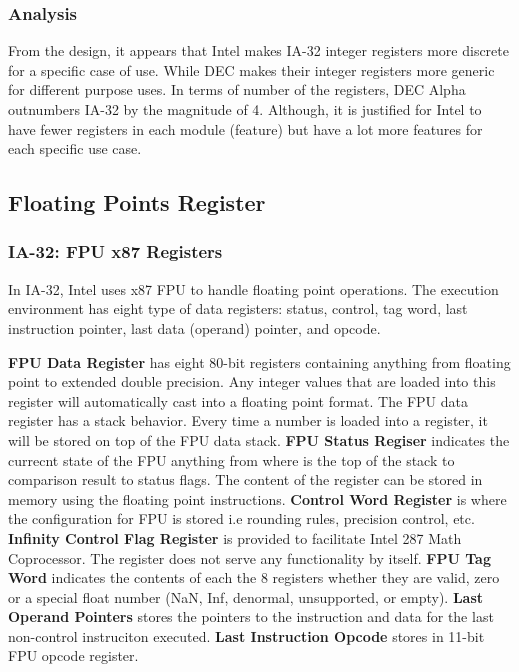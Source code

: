 \documentclass[letterpaper,10pt,titlepage]{article}
\begin{document}
\subsubsection{Analysis}
From the design, it appears that Intel makes IA-32 integer registers more 
discrete for a specific case of use. While DEC makes their integer registers 
more generic for different purpose uses. In terms of number of the registers,
DEC Alpha outnumbers IA-32 by the magnitude of 4. Although, it is justified
for Intel to have fewer registers in each module (feature) but have a lot more
features for each specific use case.


\subsection{Floating Points Register}
\subsubsection{IA-32: FPU x87 Registers}
In IA-32, Intel uses x87 FPU to handle floating point operations. The
execution environment has eight type of data registers: status, control,
tag word, last instruction pointer, last data (operand) pointer, and opcode.
\par
\textbf{FPU Data Register} has eight 80-bit registers containing anything
from floating point to extended double precision. Any integer values that are
loaded into this register will automatically cast into a floating point 
format. The FPU data register has a stack behavior. Every time a number is
loaded into a register, it will be stored on top of the FPU data stack. 
\textbf{FPU Status Regiser} indicates the currecnt state of the FPU anything
from where is the top of the stack to comparison result to status flags.  
The content of the register can be stored in memory using the floating point
instructions. \textbf{Control Word Register} is where the configuration for 
FPU is stored i.e rounding rules, precision control, etc. \textbf{Infinity
Control Flag Register} is provided to facilitate Intel 287 Math Coprocessor. 
The register does not serve any functionality by itself. \textbf{FPU Tag Word}
indicates the contents of each the 8 registers whether they are valid, zero or 
a special float number (NaN, Inf, denormal, unsupported, or empty). \textbf{Last 
Operand Pointers} stores the pointers to the instruction and data for the last
non-control instruciton executed. \textbf{Last Instruction Opcode} stores in 
11-bit FPU opcode register. 
\end{document}
